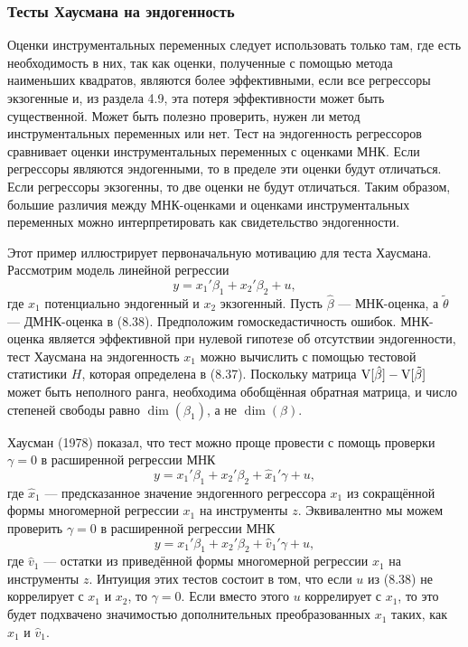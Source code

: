 \subsubsection{Тесты Хаусмана на эндогенность}

Оценки инструментальных переменных следует использовать только там, где есть необходимость в них, так как оценки, полученные с помощью метода наименьших квадратов, являются более эффективными, если все регрессоры экзогенные и, из раздела 4.9, эта потеря эффективности может быть существенной. Может быть полезно проверить, нужен ли метод инструментальных переменных или нет. Тест на эндогенность регрессоров сравнивает оценки инструментальных переменных с оценками МНК. Если регрессоры являются эндогенными, то в пределе эти оценки будут отличаться. Если регрессоры экзогенны, то две оценки не будут отличаться. Таким образом, большие различия между МНК-оценками и оценками инструментальных переменных можно интерпретировать как свидетельство эндогенности.

Этот пример иллюстрирует первоначальную мотивацию для теста Хаусмана. Рассмотрим модель линейной регрессии
\begin{equation}
y = x_1'\beta_1 + x_2'\beta_2 + u,
\end{equation}
где $x_1$ потенциально эндогенный и $x_2$ экзогенный. Пусть $\hat{\beta}$ --- МНК-оценка, а $\tilde{\theta}$ --- ДМНК-оценка в (8.38). Предположим гомоскедастичность ошибок. МНК-оценка является эффективной при нулевой гипотезе об отсутствии эндогенности, тест Хаусмана на эндогенность $x_1$ можно вычислить с помощью тестовой статистики $H$, которая определена в (8.37). Поскольку матрица $\mathrm{V}[\hat{\beta}] - \mathrm{V}[\tilde{\beta}]$ может быть неполного ранга, необходима обобщённая обратная матрица, и число степеней свободы равно $\dim(\beta_1)$, а не $\dim(\beta)$.

Хаусман (1978) показал, что тест можно проще провести с помощь проверки $\gamma = 0$ в расширенной регрессии МНК
\[
y = x_1'\beta_1 + x_2'\beta_2 + \hat{x}_1'\gamma + u,
\]
где $\hat{x}_1$ --- предсказанное значение эндогенного регрессора $x_1$ из сокращённой формы многомерной регрессии $x_1$ на инструменты $z$. Эквивалентно мы можем проверить $\gamma = 0$ в расширенной регрессии МНК
\[
y = x_1'\beta_1 + x_2'\beta_2 + \hat{v}_1'\gamma + u,
\]
где $\hat{v}_1$ --- остатки из приведённой формы многомерной регрессии $x_1$ на инструменты $z$. Интуиция этих тестов состоит в том, что если $u$ из (8.38) не коррелирует с $x_1$ и $x_2$, то $\gamma = 0$. Если вместо этого $u$ коррелирует с $x_1$, то это будет подхвачено значимостью дополнительных преобразованных $x_1$ таких, как $\hat{x}_1$ и $\hat{v}_1$.

